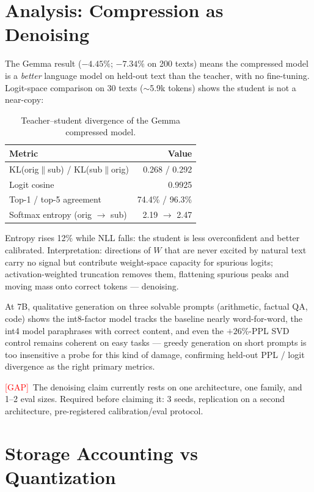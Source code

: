 \documentclass[11pt]{article}
\newcommand{\gap}{\textcolor{red}{[GAP]}}
\begin{document}
\section{Analysis: Compression as Denoising}\label{sec:denoise}

The Gemma result ($-4.45\%$; $-7.34\%$ on 200 texts) means the compressed
model is a \emph{better} language model on held-out text than the teacher,
with no fine-tuning. Logit-space comparison on 30 texts ($\sim$5.9k tokens)
shows the student is not a near-copy:

\begin{table}[h]
\centering
\begin{tabular}{lr}
\toprule
Metric & Value \\
\midrule
KL(orig$\|$sub) / KL(sub$\|$orig) & 0.268 / 0.292 \\
Logit cosine                      & 0.9925 \\
Top-1 / top-5 agreement           & 74.4\% / 96.3\% \\
Softmax entropy (orig $\to$ sub)  & 2.19 $\to$ 2.47 \\
\bottomrule
\end{tabular}
\caption{Teacher--student divergence of the Gemma compressed model.}
\label{tab:divergence}
\end{table}

Entropy rises 12\% while NLL falls: the student is less overconfident and
better calibrated. Interpretation: directions of $W$ that are never excited
by natural text carry no signal but contribute weight-space capacity for
spurious logits; activation-weighted truncation removes them, flattening
spurious peaks and moving mass onto correct tokens --- denoising.

At 7B, qualitative generation on three solvable prompts (arithmetic,
factual QA, code) shows the int8-factor model tracks the baseline nearly
word-for-word, the int4 model paraphrases with correct content, and even
the $+26\%$-PPL SVD control remains coherent on easy tasks --- greedy
generation on short prompts is too insensitive a probe for this kind of
damage, confirming held-out PPL / logit divergence as the right primary
metrics.

\gap\ The denoising claim currently rests on one architecture, one family,
and 1--2 eval sizes. Required before claiming it: 3 seeds, replication on a
second architecture, pre-registered calibration/eval protocol.

\section{Storage Accounting vs Quantization}\label{sec:storage}
\end{document}

